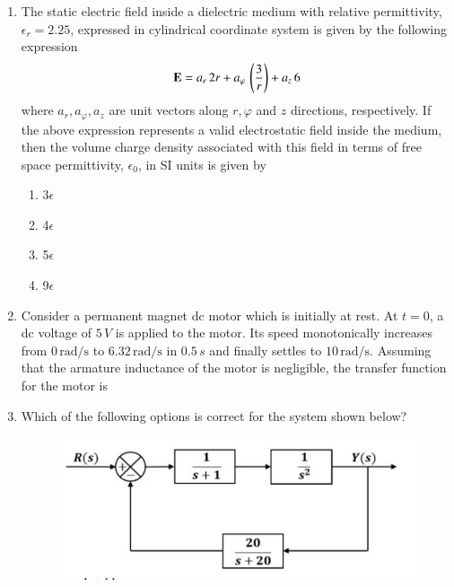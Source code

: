 \documentclass[journal,12pt,onecolumn]{IEEEtran}
\theoremstyle{remark}
\begin{document}
\begin{enumerate}[start=1, label=Q.\arabic*]
\item The static electric field inside a dielectric medium with relative permittivity, $\epsilon_r = 2.25$, expressed in cylindrical coordinate system is given by the following expression
\[
\mathbf{E} = a_r \, 2r + a_\varphi \, \left(\frac{3}{r}\right) + a_z \, 6
\]
where $a_r, a_\varphi, a_z$ are unit vectors along $r, \varphi$ and $z$ directions, respectively. If the above expression represents a valid electrostatic field inside the medium, then the volume charge density associated with this field in terms of free space permittivity, $\epsilon_0$, in SI units is given by\brak{\text{:}}
\begin{enumerate}
\item 3$\epsilon$
\item 4$\epsilon$
\item 5$\epsilon$
\item 9$\epsilon$
\end{enumerate}
\hfill {}

\item Consider a permanent magnet dc  motor which is initially at rest. At $t=0$, a dc voltage of $5 \, V$ is applied to the motor. Its speed monotonically increases from $0 \, \text{rad/s}$ to $6.32 \, \text{rad/s}$ in $0.5 \, s$ and finally settles to $10 \, \text{rad/s}$. Assuming that the armature inductance of the motor is negligible, the transfer function for the motor is
\begin{enumerate}
\end{enumerate}
\hfill {}


\item Which of the following options is correct for the system shown below?

\begin{figure}[H]
\centering
\includegraphics[width=0.7\columnwidth]{qs45.png}
\caption{}
\end{figure}


\end{enumerate}
\end{document}
